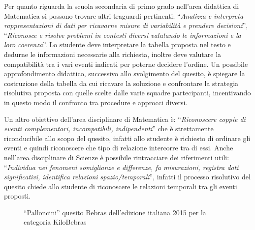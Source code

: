 \documentclass[12pt]{report}
\begin{document}
Per quanto riguarda la scuola secondaria di primo grado nell'area didattica di Matematica si possono trovare altri traguardi pertinenti:
``\textit{Analizza e interpreta rappresentazioni di dati per ricavarne misure di variabilità e prendere decisioni}'', ``\textit{Riconosce e risolve problemi in contesti diversi valutando le informazioni e la loro coerenza}''.
Lo studente deve interpretare la tabella proposta nel testo e dedurne le informazioni necessarie alla richiesta, inoltre deve valutare la compatibilità tra i vari eventi indicati per poterne decidere l'ordine.
Un possibile approfondimento didattico, successivo allo svolgimento del quesito, è spiegare la costruzione della tabella da cui ricavare la soluzione e confrontare la strategia risolutiva proposta con quelle scelte dalle varie squadre partecipanti, incentivando in questo modo il confronto tra procedure e approcci diversi.

Un altro obiettivo dell'area disciplinare di Matematica è: ``\textit{Riconoscere coppie di eventi complementari, incompatibili, indipendenti}'' che è strettamente riconducibile allo scopo del quesito, infatti allo studente è richiesto di ordinare gli eventi e quindi riconoscere che tipo di relazione intercorre tra di essi.
Anche nell'area disciplinare di Scienze è possibile rintracciare dei riferimenti utili:
``\textit{Individua nei fenomeni somiglianze e differenze, fa misurazioni, registra dati significativi, identifica relazioni spazio/temporali}'', infatti il processo risolutivo del quesito chiede allo studente di riconoscere le relazioni temporali tra gli eventi proposti.



\bigskip
\begin{figure}[h]
	\centering
	\caption{``Palloncini'' quesito Bebras dell'edizione italiana 2015 per la categoria KiloBebras}\label{fig:palloncini}
\end{figure}
\end{document}
